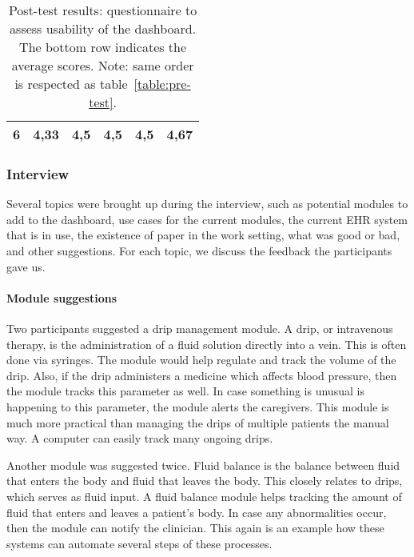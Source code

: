 \begin{table}[!t]
{\begin{tabular}{cccccc}
        \textbf{6}                                                                    & \textbf{4,33}                                                          & \textbf{4,5}                                                                  & \textbf{4,5}                                                                & \textbf{4,5}                                                                                       & \textbf{4,67}                                                                   \\ \hline
        \end{tabular}%
        }
        \caption{Post-test results: questionnaire to assess usability of the dashboard. The bottom row indicates the average scores. Note: same order is respected as table~\ref{table:pre-test}.}\label{table:post-test}
    \end{table}

    \subsubsection{Interview}\label{results_interview}

    Several topics were brought up during the interview, such as potential modules to add to the dashboard, use cases for the current modules, the current EHR system that is in use, the existence of paper in the work setting, what was good or bad, and other suggestions. For each topic, we discuss the feedback the participants gave us.

    \paragraph{Module suggestions} Two participants suggested a drip management module. A drip, or intravenous therapy, is the administration of a fluid solution directly into a vein. This is often done via syringes. The module would help regulate and track the volume of the drip. Also, if the drip administers a medicine which affects blood pressure, then the module tracks this parameter as well. In case something is unusual is happening to this parameter, the module alerts the caregivers. This module is much more practical than managing the drips of multiple patients the manual way. A computer can easily track many ongoing drips.

    Another module was suggested twice. Fluid balance is the balance between fluid that enters the body and fluid that leaves the body. This closely relates to drips, which serves as fluid input. A fluid balance module helps tracking the amount of fluid that enters and leaves a patient's body. In case any abnormalities occur, then the module can notify the clinician. This again is an example how these systems can automate several steps of these processes.


